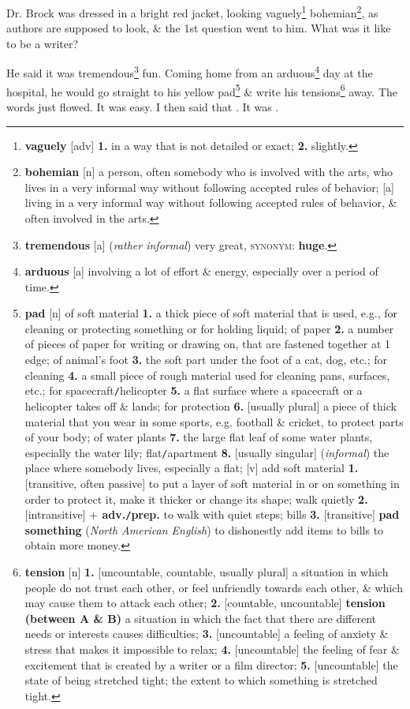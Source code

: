 \documentclass[oneside]{book}
\numberwithin{equation}{section}
\begin{document}
Dr. Brock was dressed in a bright red jacket, looking vaguely\footnote{\textbf{vaguely} [adv] \textbf{1.} in a way that is not detailed or exact; \textbf{2.} slightly.} bohemian\footnote{\textbf{bohemian} [n] a person, often somebody who is involved with the arts, who lives in a very informal way without following accepted rules of behavior; [a] living in a very informal way without following accepted rules of behavior, \& often involved in the arts.}, as authors are supposed to look, \& the 1st question went to him. What was it like to be a writer?

He said it was tremendous\footnote{\textbf{tremendous} [a] (\textit{rather informal}) very great, \textsc{synonym}: \textbf{huge}.} fun. Coming home from an arduous\footnote{\textbf{arduous} [a] involving a lot of effort \& energy, especially over a period of time.} day at the hospital, he would go straight to his yellow pad\footnote{\textbf{pad} [n] \textsf{of soft material} \textbf{1.} a thick piece of soft material that is used, e.g., for cleaning or protecting something or for holding liquid; \textsf{of paper} \textbf{2.} a number of pieces of paper for writing or drawing on, that are fastened together at 1 edge; \textsf{of animal's foot} \textbf{3.} the soft part under the foot of a cat, dog, etc.; \textsf{for cleaning} \textbf{4.} a small piece of rough material used for cleaning pans, surfaces, etc.; \textsf{for spacecraft\texttt{/}helicopter} \textbf{5.} a flat surface where a spacecraft or a helicopter takes off \& lands; \textsf{for protection} \textbf{6.} [usually plural] a piece of thick material that you wear in some sports, e.g. football \& cricket, to protect parts of your body; \textsf{of water plants} \textbf{7.} the large flat leaf of some water plants, especially the water lily; \textsf{flat\texttt{/}apartment} \textbf{8.} [usually singular] (\textit{informal}) the place where somebody lives, especially a flat; [v] \textsf{add soft material} \textbf{1.} [transitive, often passive] to put a layer of soft material in or on something in order to protect it, make it thicker or change its shape; \textsf{walk quietly} \textbf{2.} [intransitive] \textbf{$+$ adv.\texttt{/}prep.} to walk with quiet steps; \textsf{bills} \textbf{3.} [transitive] \textbf{pad something} (\textit{North American English}) to dishonestly add items to bills to obtain more money.} \& write his tensions\footnote{\textbf{tension} [n] \textbf{1.} [uncountable, countable, usually plural] a situation in which people do not trust each other, or feel unfriendly towards each other, \& which may cause them to attack each other; \textbf{2.} [countable, uncountable] \textbf{tension (between A \& B)} a situation in which the fact that there are different needs or interests causes difficulties; \textbf{3.} [uncountable] a feeling of anxiety \& stress that makes it impossible to relax; \textbf{4.} [uncountable] the feeling of fear \& excitement that is created by a writer or a film director; \textbf{5.} [uncountable] the state of being stretched tight; the extent to which something is stretched tight.} away. The words just flowed. It was easy. I then said that . It was .
\end{document}
